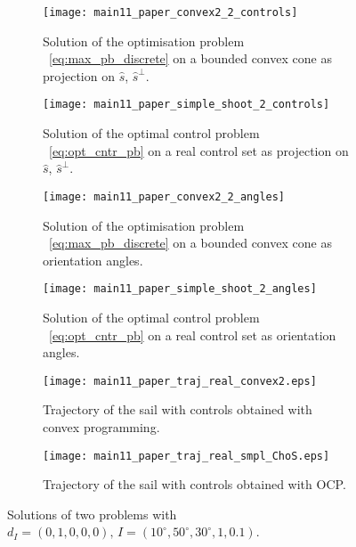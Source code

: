\documentclass[AMA,STIX1COL]{WileyNJD-v2}
\newcommand{\uvect}[1]{\hat{#1}}
\newcommand{\mybar}[1]{#1}
\begin{document}
\begin{figure}[ht]
	\centering
	\begin{subfigure}[b]{0.45\textwidth}
		\centering
		\texttt{[image: main11\_paper\_convex2\_2\_controls]}
		\caption{Solution of the optimisation problem ~\eqref{eq:max_pb_discrete} on a bounded convex cone  as projection on $\uvect{s}$, $\uvect{s}^{\perp}$.}
		\label{fig:sol_conv2_proj}
	\end{subfigure}
	\hspace{1cm}
	\begin{subfigure}[b]{0.45\textwidth}
		\centering
		\texttt{[image: main11\_paper\_simple\_shoot\_2\_controls]}
		\caption{Solution of the optimal control problem ~\eqref{eq:opt_cntr_pb} on a real control set  as projection on $\uvect{s}$, $\uvect{s}^{\perp}$.}
		\label{fig:sol_simple_shoot_proj}
	\end{subfigure}
	\begin{subfigure}[t]{0.45\textwidth}
		\centering
		\texttt{[image: main11\_paper\_convex2\_2\_angles]}
		\caption{Solution of the optimisation problem ~\eqref{eq:max_pb_discrete} on a bounded convex cone as orientation angles.}
		\label{fig:sol_conv2_angles}
	\end{subfigure}
	\hspace{1cm}
	\begin{subfigure}[t]{0.45\textwidth}
		\centering
		\texttt{[image: main11\_paper\_simple\_shoot\_2\_angles]}
		\caption{Solution of the optimal control problem ~\eqref{eq:opt_cntr_pb} on a real control set as orientation angles.}
		\label{fig:sol_simple_shoot_angles}
	\end{subfigure}
	\begin{subfigure}[b]{0.45\textwidth}
		\centering
		\texttt{[image: main11\_paper\_traj\_real\_convex2.eps]}
		\caption{Trajectory of the sail with controls obtained with convex programming.}
		\label{fig:sol_traj_conv2}
	\end{subfigure}
	\hspace{1cm}
	\begin{subfigure}[b]{0.45\textwidth}
		\centering
		\texttt{[image: main11\_paper\_traj\_real\_smpl\_ChoS.eps]}
		\caption{Trajectory of the sail with controls obtained with \ac{OCP}.}
		\label{fig:sol_traj_simple}
	\end{subfigure}
	\caption{Solutions of two problems with $d_I = (0,1,0,0,0), \, \mybar{I} = (10^\circ, 50^\circ, 30^\circ, 1, 0.1)$.}
	\label{fig:sol_both_conv_opt_simple_shoot_ChoS}
\end{figure}
\end{document}
